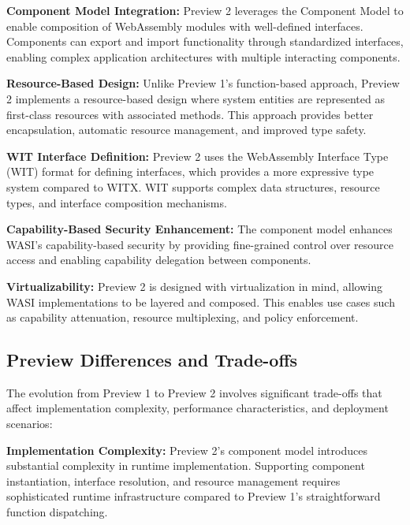 
\textbf{Component Model Integration:} Preview 2 leverages the Component Model to enable composition of WebAssembly modules with well-defined interfaces. Components can export and import functionality through standardized interfaces, enabling complex application architectures with multiple interacting components.

\textbf{Resource-Based Design:} Unlike Preview 1's function-based approach, Preview 2 implements a resource-based design where system entities are represented as first-class resources with associated methods. This approach provides better encapsulation, automatic resource management, and improved type safety.

\textbf{WIT Interface Definition:} Preview 2 uses the WebAssembly Interface Type (WIT) format for defining interfaces, which provides a more expressive type system compared to WITX. WIT supports complex data structures, resource types, and interface composition mechanisms.

\textbf{Capability-Based Security Enhancement:} The component model enhances WASI's capability-based security by providing fine-grained control over resource access and enabling capability delegation between components.

\textbf{Virtualizability:} Preview 2 is designed with virtualization in mind, allowing WASI implementations to be layered and composed. This enables use cases such as capability attenuation, resource multiplexing, and policy enforcement.

\subsection{Preview Differences and Trade-offs}
\label{subsec:preview-differences}

The evolution from Preview 1 to Preview 2 involves significant trade-offs that affect implementation complexity, performance characteristics, and deployment scenarios:

\textbf{Implementation Complexity:} Preview 2's component model introduces substantial complexity in runtime implementation. Supporting component instantiation, interface resolution, and resource management requires sophisticated runtime infrastructure compared to Preview 1's straightforward function dispatching.

